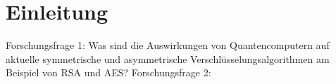 \section{Einleitung}
Forschungsfrage 1: Was sind die Auswirkungen von Quantencomputern auf 
aktuelle symmetrische und asymmetrische Verschlüsselungsalgorithmen 
am Beispiel von RSA und AES?
Forschungsfrage 2: 